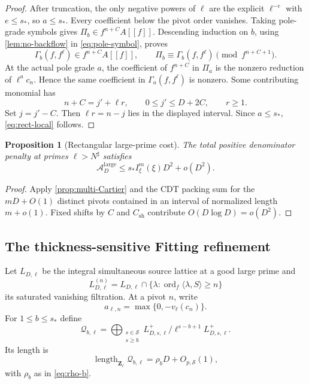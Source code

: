 \documentclass[11pt]{article}
\newtheorem{proposition}[proposition]{Proposition}
\theoremstyle{definition}
\theoremstyle{remark}
\newcommand{\Z}{\mathbf Z}
\newcommand{\ord}{\operatorname{ord}}
\begin{document}
\begin{proof}
After truncation, the only negative powers of $\ell$ are the explicit
$\ell^{-e}$ with $e\le s_*$, so $a\le s_*$.  Every coefficient below the
pivot order vanishes.  Taking pole-grade symbols gives
$\Pi_b\in f^{n+C}A[[f]]$.  Descending induction on $b$, using
\cref{lem:no-backflow} in \eqref{eq:pole-symbol}, proves
\[
 \Gamma_b(f,f^\ell)\in f^{n+C}A[[f]],
 \qquad
 \Pi_b\equiv\Gamma_b(f,f^\ell)\pmod{f^{n+C+1}}.
\]
At the actual pole grade $a$, the coefficient of $f^{n+C}$ in $\Pi_a$ is the
nonzero reduction of $\ell^ac_n$.  Hence the same coefficient in
$\Gamma_a(f,f^\ell)$ is nonzero.  Some contributing monomial has
\[
 n+C=j'+\ell r,
 \qquad0\le j'\le D+2C,
 \qquad r\ge1.
\]
Set $j=j'-C$.  Then $\ell r=n-j$ lies in the displayed interval.  Since
$a\le s_*$, \eqref{eq:rect-local} follows.
\end{proof}

\begin{proposition}[Rectangular large-prime cost]\label{prop:rect-large}
The total positive denominator penalty at primes $\ell>N^\sharp$ satisfies
\begin{equation}\label{eq:rect-large}
 \mathscr A_D^{\mathrm{large}}
 \le s_*I^m_\xi(\xi)D^2+o(D^2).
\end{equation}
\end{proposition}

\begin{proof}
Apply \cref{prop:multi-Cartier} and the CDT packing sum for the
$mD+O(1)$ distinct pivots contained in an interval of normalized length
$m+o(1)$.  Fixed shifts by $C$ and $C_{\mathrm{sh}}$ contribute
$O(D\log D)=o(D^2)$.
\end{proof}

\subsection{The thickness-sensitive Fitting refinement}

Let $L_{D,\ell}$ be the integral simultaneous source lattice at a good large
prime and
\[
 L_{D,\ell}^{(n)}=
 L_{D,\ell}\cap\{\lambda:\ord_f\langle\lambda,S\rangle\ge n\}
\]
its saturated vanishing filtration.  At a pivot $n$, write
\[
 a_{\ell,n}=\max\{0,-v_\ell(c_n)\}.
\]
For $1\le b\le s_*$ define
\begin{equation}\label{eq:Qb}
 \mathcal Q_{b,\ell}=
 \bigoplus_{\substack{s\in\mathcal S\\s\ge b}}
 L^+_{D,s,\ell}/\ell^{s-b+1}L^+_{D,s,\ell}.
\end{equation}
Its length is
\[
 \operatorname{length}_{\Z_\ell}\mathcal Q_{b,\ell}
 =\rho_bD+O_{p,\mathcal S}(1),
\]
with $\rho_b$ as in \eqref{eq:rho-b}.
\end{document}
